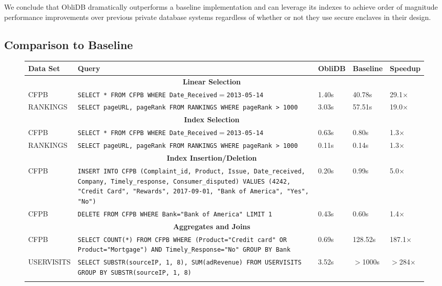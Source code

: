\documentclass[letterpaper,twocolumn,10pt]{article}
\def\name/{ObliDB}
\begin{document}
We conclude that \name/ dramatically outperforms a baseline implementation and can leverage its indexes to achieve order of magnitude performance improvements over previous private database systems regardless of whether or not they use secure enclaves in their design. 

\subsection{Comparison to Baseline}
\begin{figure}
\small
\centering
\begin{tabular}{p{2.2cm} p{7cm} l l l} 
 \textbf{Data Set}& \textbf{Query}& \textbf{\name/} & \textbf{Baseline} & \textbf{Speedup}\\ \hline\rule{0pt}{2ex}
 &\multicolumn{2}{c}{\textbf{Linear Selection}}\\\rule{0pt}{2ex}
CFPB & \texttt{SELECT * FROM CFPB WHERE Date\_Received$=$2013-05-14}& 1.40s & 40.78s & 29.1$\times$\\\rule{0pt}{2ex} 
RANKINGS & \texttt{SELECT pageURL, pageRank FROM RANKINGS WHERE pageRank > 1000 }& 3.03s & 57.51s& 19.0$\times$ \\\rule{0pt}{2ex}
&\multicolumn{2}{c}{\textbf{Index Selection}}\\\rule{0pt}{2ex}
CFPB & \texttt{SELECT * FROM CFPB WHERE Date\_Received$=$2013-05-14} & 0.63s & 0.80s & 1.3$\times$\\\rule{0pt}{2ex} 
RANKINGS & \texttt{SELECT pageURL, pageRank FROM RANKINGS WHERE pageRank > 1000 }& 0.11s & 0.14s& 1.3$\times$ \\\rule{0pt}{2ex}
&\multicolumn{2}{c}{\textbf{Index Insertion/Deletion}}\\\rule{0pt}{2ex}
CFPB & \texttt{INSERT INTO CFPB (Complaint\_id, Product, Issue, Date\_received, Company, Timely\_response, Consumer\_disputed) VALUES (4242, "Credit Card", "Rewards", 2017-09-01, "Bank of America", "Yes", "No")}& 0.20s& 0.99s& 5.0$\times$ \\\rule{0pt}{2ex} 
CFPB & \texttt{DELETE FROM CFPB WHERE Bank="Bank of America" LIMIT 1}& 0.43s& 0.60s& 1.4$\times$ \\\rule{0pt}{2ex}
&\multicolumn{2}{c}{\textbf{Aggregates and Joins}}\\\rule{0pt}{2ex}
CFPB & \texttt{SELECT COUNT(*) FROM CFPB WHERE (Product="Credit card" OR Product="Mortgage") AND Timely\_Response="No" GROUP BY Bank}& 0.69s & 128.52s &  187.1$\times$\\\rule{0pt}{2ex}
USERVISITS & \texttt{SELECT SUBSTR(sourceIP, 1, 8), SUM(adRevenue) FROM USERVISITS GROUP BY SUBSTR(sourceIP, 1, 8)}& 3.52s &$>$1000s & $>$284$\times$\\\rule{0pt}{2ex}

\end{tabular}
\end{figure}
\end{document}
